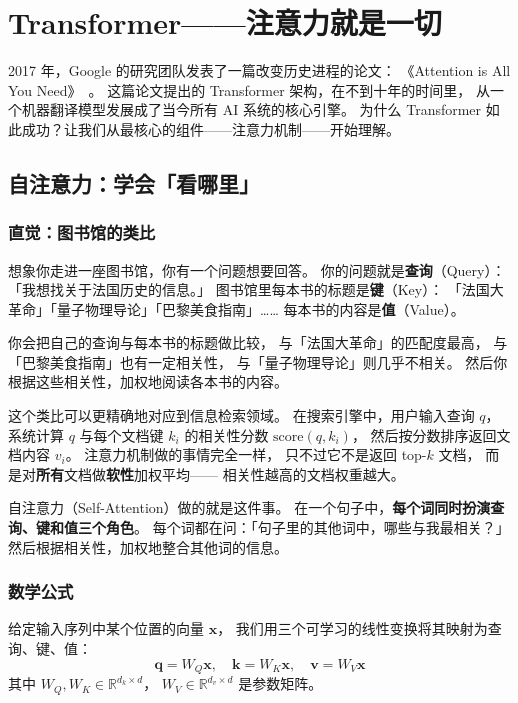 \chapter{Transformer——注意力就是一切}
\label{ch:transformer}

2017 年，Google 的研究团队发表了一篇改变历史进程的论文：
《Attention is All You Need》~\cite{vaswani2017attention}。
这篇论文提出的 Transformer 架构，在不到十年的时间里，
从一个机器翻译模型发展成了当今所有 AI 系统的核心引擎。
为什么 Transformer 如此成功？让我们从最核心的组件——注意力机制——开始理解。

\section{自注意力：学会「看哪里」}

\subsection{直觉：图书馆的类比}

想象你走进一座图书馆，你有一个问题想要回答。
你的问题就是\textbf{查询}（Query）：
「我想找关于法国历史的信息。」
图书馆里每本书的标题是\textbf{键}（Key）：
「法国大革命」「量子物理导论」「巴黎美食指南」……
每本书的内容是\textbf{值}（Value）。

你会把自己的查询与每本书的标题做比较，
与「法国大革命」的匹配度最高，
与「巴黎美食指南」也有一定相关性，
与「量子物理导论」则几乎不相关。
然后你根据这些相关性，加权地阅读各本书的内容。

这个类比可以更精确地对应到信息检索领域。
在搜索引擎中，用户输入查询 $q$，
系统计算 $q$ 与每个文档键 $k_i$ 的相关性分数 $\mathrm{score}(q, k_i)$，
然后按分数排序返回文档内容 $v_i$。
注意力机制做的事情完全一样，
只不过它不是返回 top-$k$ 文档，
而是对\textbf{所有}文档做\textbf{软性}加权平均——
相关性越高的文档权重越大。

自注意力（Self-Attention）做的就是这件事。
在一个句子中，\textbf{每个词同时扮演查询、键和值三个角色}。
每个词都在问：「句子里的其他词中，哪些与我最相关？」
然后根据相关性，加权地整合其他词的信息。

\subsection{数学公式}

给定输入序列中某个位置的向量 $\mathbf{x}$，
我们用三个可学习的线性变换将其映射为查询、键、值：
\begin{equation}
  \mathbf{q} = W_Q \mathbf{x}, \quad
  \mathbf{k} = W_K \mathbf{x}, \quad
  \mathbf{v} = W_V \mathbf{x}
\end{equation}
其中 $W_Q, W_K \in \mathbb{R}^{d_k \times d}$，
$W_V \in \mathbb{R}^{d_v \times d}$ 是参数矩阵。

